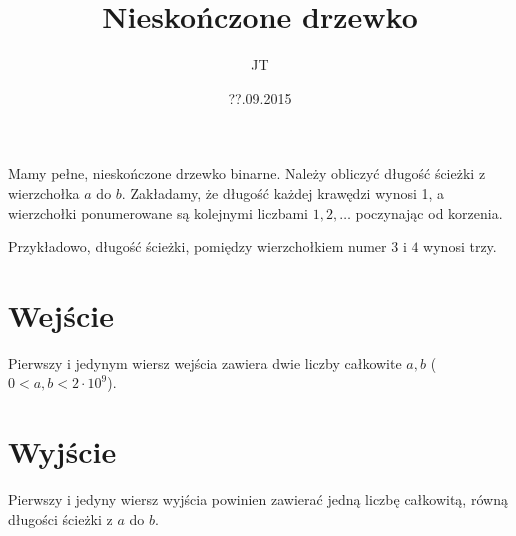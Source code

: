 \documentclass[zad,zawodnik,utf8]{sinol}
\title{Nieskończone drzewko}
\author{JT} %
\date{??.09.2015}
\begin{document}
\begin{tasktext}%
    Mamy pełne, nieskończone drzewko binarne. Należy obliczyć długość ścieżki z wierzchołka $a$ do $b$. 
    Zakładamy, że długość każdej krawędzi wynosi 1, a wierzchołki ponumerowane są kolejnymi liczbami $1, 2, \ldots$ 
    poczynając od korzenia.

\begin{figure}[h!]\centering
{}
\end{figure}
    \noindent
    Przykładowo, długość ścieżki, pomiędzy wierzchołkiem numer $3$ i $4$ wynosi trzy.

\section{Wejście}
    Pierwszy i jedynym wiersz wejścia zawiera dwie liczby całkowite $a, b$ ($0 < a, b < 2 \cdot 10^9$).

\section{Wyjście}
    Pierwszy i jedyny wiersz wyjścia powinien zawierać jedną liczbę całkowitą, 
    równą długości ścieżki z $a$ do $b$.
\makecompactexample


\end{tasktext}
\end{document}
